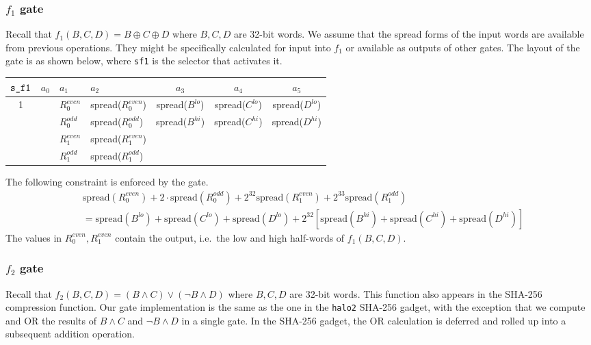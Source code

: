 \documentclass[10pt]{article}
\begin{document}
\subsubsection{$f_1$ gate}%
\label{sec:f1_gate}
Recall that $f_1(B,C,D) = B \oplus C \oplus D$ where $B,C,D$ are 32-bit words. We assume that the spread forms of the input words are available from previous operations. They might be specifically calculated for input into $f_1$ or available as outputs of other gates. The layout of the gate is as shown below, where \texttt{s\textunderscore f1} is the selector that activates it.
\begin{center}
  \begin{tabular}{c|c|l|l|c|c|c}
    $\texttt{s\textunderscore f1}$ & $a_0$ & $a_1$ & $a_2$ & $a_3$ & $a_4$ & $a_5$ \\ \hline
    1  &     & $R_0^{even}$ & spread($R_0^{even}$) & spread($B^{lo}$) & spread($C^{lo}$)  & spread($D^{lo}$)  \\ 
       &     & $R_0^{odd}$  & spread($R_0^{odd}$)  & spread($B^{hi}$) & spread($C^{hi}$)  & spread($D^{hi}$)  \\ 
       &     & $R_1^{even}$ & spread($R_1^{even}$) &                  &                   &                   \\ 
       &     & $R_1^{odd}$  & spread($R_1^{odd}$)  &                  &                   &                   \\ \hline
  \end{tabular}
\end{center}

  The following constraint is enforced by the gate.
\begin{align*}
  & \text{spread}(R_0^{even}) + 2\cdot \text{spread}(R_0^{odd}) + 2^{32}\text{spread}(R_1^{even}) + 2^{33}\text{spread}(R_1^{odd})  \\
  &= \text{spread} (B^{lo}) +\text{spread} (C^{lo}) + \text{spread} (D^{lo}) + 2^{32} \left[ \text{spread} (B^{hi}) +\text{spread} (C^{hi}) + \text{spread} (D^{hi}) \right]
\end{align*}
The values in $R_0^{even}, R_1^{even}$ contain the output, i.e.~the low and high half-words of $f_1(B,C,D)$.

\subsubsection{$f_2$ gate}%
\label{sec:f2_gate}
Recall that $f_2(B,C,D) = (B \wedge C) \vee (\lnot B \wedge D)$ where $B,C,D$ are 32-bit words. This function also appears in the SHA-256 compression function. Our gate implementation is the same as the one in the \texttt{halo2} SHA-256 gadget, with the exception that we compute and OR the results of $B \wedge C$ and $\lnot B \wedge D$ in a single gate. In the SHA-256 gadget, the OR calculation is deferred and rolled up into a subsequent addition operation.
\end{document}

